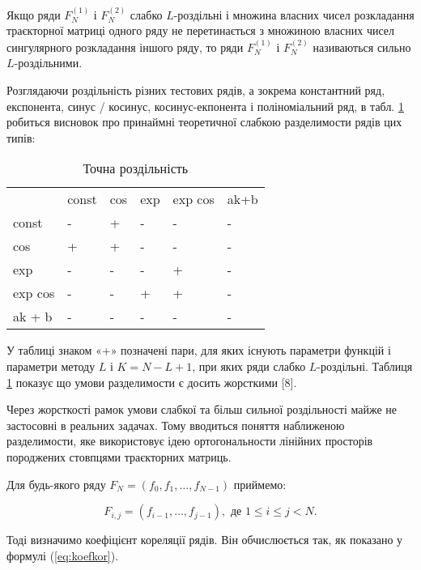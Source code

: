 Якщо ряди $F_{N}^{(1)}$ і $F_{N}^{(2)}$ слабко $L$-роздільні і множина власних чисел розкладання траєкторної матриці одного ряду не перетинається з множиною власних чисел сингулярного розкладання іншого ряду, то ряди $F_{N}^{(1)}$ і $F_{N}^{(2)}$ називаються сильно $L$-роздільними.

Розглядаючи роздільність різних тестових рядів, а зокрема константний ряд, експонента, синус / косинус, косинус-екпонента і поліноміальний ряд, в табл. \ref{tab:exactsep} робиться висновок про принаймні теоретичної слабкою разделимости рядів цих типів:

\begin{table}[h]
	\captionstyle{ \raggedright}
	\caption{Точна роздільність}\label{tab:exactsep}
	\begin{tabular}{| m{} | m{} | m{} | m{} | m{} | m{} |}
	\hline
	 & const & cos & exp & exp cos & ak+b \\
	\hlinewd{2pt}
	const & - & + & - & - & - \\
	\hline
	cos & + & + & - & - & - \\
	\hline
	exp & - & - & - & + & - \\
	\hline
	exp cos & - & - & + & + & - \\
	\hline
	ak + b & - & - & - & - & - \\
	\hline
	\end{tabular}
\end{table}

У таблиці знаком «+» позначені пари, для яких існують параметри функцій і параметри методу $L$ і $K = N - L + 1$, при яких ряди слабко $L$-роздільні. Таблиця \ref{tab:exactsep} показує що умови разделимости є досить жорсткими [8].

Через жорсткості рамок умови слабкої та більш сильної роздільності майже не застосовні в реальних задачах. Тому вводиться поняття наближеною разделимости, яке використовує ідею ортогональности лінійних просторів породжених стовпцями траєкторних матриць.

Для будь-якого ряду $F_{N} = (f_{0}, f_{1}, \dots, f_{N-1})$ приймемо:

\begin{equation}
F_{i,j} = (f_{i-1}, \dots, f_{j-1}), \text{ де } 1 \le i \le j < N.
\end{equation}


\vspace{1.5em}

Тоді визначимо коефіцієнт кореляції рядів. Він обчислюється так, як показано у формулі (\ref{eq:koefkor}).


